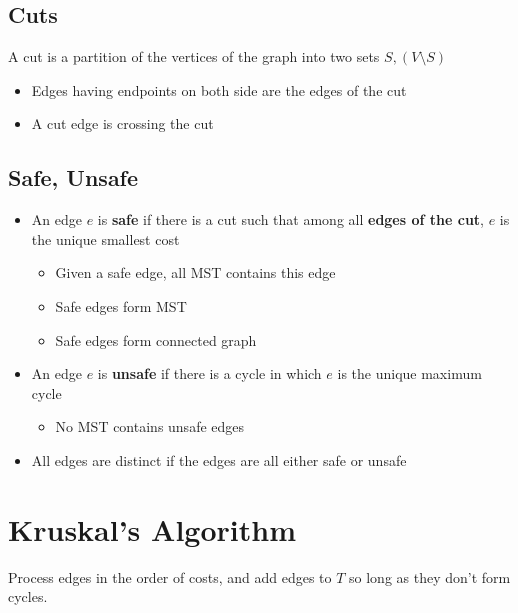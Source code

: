   \subsection{Cuts}

    A cut is a partition of the vertices of the graph into two sets
    $ S, \left( V \setminus S \right) $

    \begin{itemize}
      \item Edges having endpoints on both side are the edges of the cut
      \item A cut edge is crossing the cut
    \end{itemize}

  \subsection{Safe, Unsafe}

    \begin{itemize}
      \item An edge $ e $ is \textbf{safe} if there is a cut such that among all
      \textbf{edges of the cut}, $ e $ is the unique smallest cost
      \begin{itemize}
        \item Given a safe edge, all MST contains this edge
        \item Safe edges form MST
        \item Safe edges form connected graph
      \end{itemize}

      \item An edge $ e $ is \textbf{unsafe} if there is a cycle in which
      $ e $ is the unique maximum cycle
      \begin{itemize}
        \item No MST contains unsafe edges
      \end{itemize}

      \item All edges are distinct if the edges are all either safe or unsafe
    \end{itemize}


\section{Kruskal’s Algorithm}

  Process edges in the order of costs, and add edges to $ T $ so long as they
  don't form cycles.

